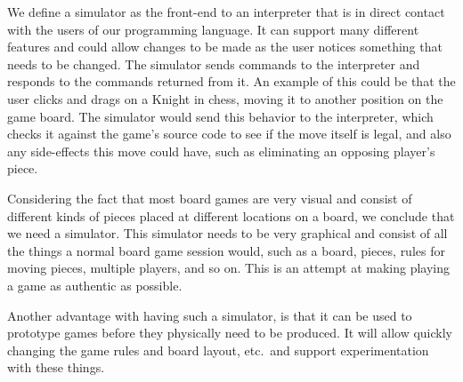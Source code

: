 We define a simulator as the front-end to an interpreter that is in direct contact with the users of our programming language. It can support many different features and could allow changes to be made as the user notices something that needs to be changed. The simulator sends commands to the interpreter and responds to the commands returned from it. An example of this could be that the user clicks and drags on a Knight in chess, moving it to another position on the game board. The simulator would send this behavior to the interpreter, which checks it against the game's source code to see if the move itself is legal, and also any side-effects this move could have, such as eliminating an opposing player's piece.

Considering the fact that most board games are very visual and consist of different kinds of pieces placed at different locations on a board, we conclude that we need a simulator. This simulator needs to be very graphical and consist of all the things a normal board game session would, such as a board, pieces, rules for moving pieces, multiple players, and so on. This is an attempt at making playing a game as authentic as possible.

Another advantage with having such a simulator, is that it can be used to prototype games before they physically need to be produced. It will allow quickly changing the game rules and board layout, etc.\ and support experimentation with these things.
